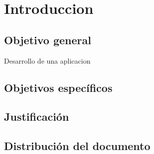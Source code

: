 \section{Introduccion}

\subsection{Objetivo general}

Desarrollo de una aplicacion

\subsection{Objetivos específicos}

\subsection{Justificación}

\subsection{Distribución del documento}

